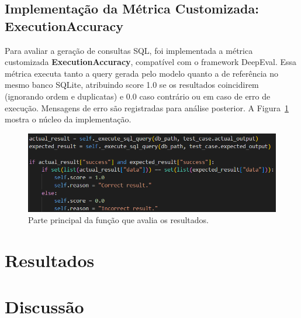 \documentclass[journal,onecolumn]{IEEEtran}
\newcommand{\figwidth}{0.7\linewidth}
\begin{document}
\subsection{Implementação da Métrica Customizada: ExecutionAccuracy}

Para avaliar a geração de consultas SQL, foi implementada a métrica customizada \textbf{ExecutionAccuracy}, compatível com o framework DeepEval. Essa métrica executa tanto a query gerada pelo modelo quanto a de referência no mesmo banco SQLite, atribuindo score 1.0 se os resultados coincidirem (ignorando ordem e duplicatas) e 0.0 caso contrário ou em caso de erro de execução. Mensagens de erro são registradas para análise posterior. A Figura~\ref{fig:custom_metric_main} mostra o núcleo da implementação.
\begin{figure}[!htpb]
    \centering
    \includegraphics[width=\figwidth]{resources/custom_metric_main.png}
    \caption{Parte principal da função que avalia os resultados.}
    \label{fig:custom_metric_main}
\end{figure}

\section{Resultados}

\section{Discussão}


\end{document}
